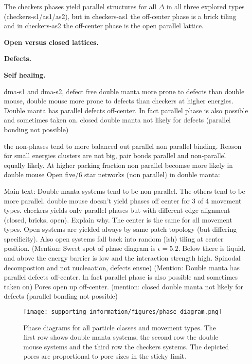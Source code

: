 \documentclass[a4paper,preprint]{revtex4}
\begin{document}
The checkers phases yield parallel structures for all $\Delta$ in all three explored types (checkers-s1/as1/as2), but in checkers-as1 the off-center phase is a brick tiling and in checkers-as2 the off-center phase is the open parallel lattice. 

\textbf{Open versus closed lattices.}

\textbf{Defects.}

\textbf{Self healing.}




dma-s1 and dma-s2, defect free 
double manta more prone to defects than double mouse, double mouse more prone to defects than checkers at higher energies.
Double manta has parallel defects off-center. In fact parallel phase is also possible and sometimes taken on. 
closed double manta not likely for defects (parallel bonding not possible) 

the non-phases tend to more balanced out parallel non parallel binding.
Reason for small energies clusters are not big, pair bonds parallel and non-parallel equally likely. 
At higher packing fraction non parallel becomse more likely 
in double mouse Open five/6 star networks (non parallel)
in double manta: 

Main text: 
Double manta systems tend to be non parallel.
The others tend to be more parallel.
double mouse doesn't yield phases off center for 3 of 4 movement types.
checkers yields only parallel phases but with different edge alignment 
(closed, bricks, open). Explain why.
The center is the same for all movement types.
Open systems are yielded always by same patch topology (but differing specificity). 
Also open systems fall back into random (ish) tiling at center position.
(Mention: Sweet spot of phase diagram is $\epsilon = 5.2$. Below there is liquid, and above the energy barrier is low and the interaction strength high. Spinodal decompostion and not nucleaation, defects ensue)
(Mention: Double manta has parallel defects off-center. In fact parallel phase is also possible and sometimes taken on) 
Pores open up off-center. 
(mention: closed double manta not likely for defects (parallel bonding not possible)






\begin{figure}
    \centering
    \texttt{[image: supporting\_information/figures/phase\_diagram.png]}
    \caption{Phase diagrams for all particle classes and movement types. The first row shows double manta systems, the second row the double mouse systems and the third row the checkers systems. The depicted pores are proportional to pore sizes in the sticky limit.}
    \label{fig:phase_diagram}
\end{figure}
\end{document}
